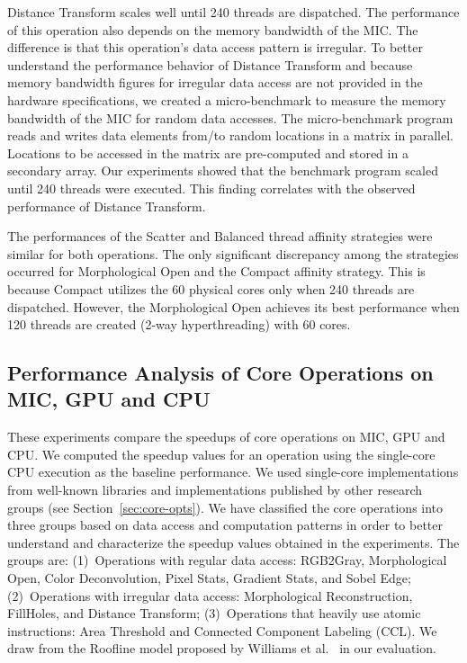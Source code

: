 Distance Transform scales well until 240 threads are dispatched. The performance 
of this operation also depends on the memory bandwidth of the MIC. The 
difference is that this operation's data access pattern is irregular. To 
better understand the performance behavior of Distance Transform and because 
memory bandwidth figures for irregular data access are not provided in the 
hardware specifications, we created a micro-benchmark to measure the memory 
bandwidth of the MIC for random data accesses. The micro-benchmark program reads 
and writes data elements from/to random locations in a matrix in parallel. 
Locations to be accessed in the matrix are pre-computed and stored in a secondary 
array. Our experiments showed that the benchmark program scaled until 240 threads 
were executed. This finding correlates with the observed performance of Distance 
Transform.

The performances of the Scatter and Balanced thread affinity strategies were
similar for both operations. The only significant discrepancy among the
strategies occurred for Morphological Open and the Compact affinity strategy.
This is because Compact utilizes the 60 physical cores only when 240 threads
are dispatched. However, the Morphological Open achieves its best performance
when 120 threads are created (2-way hyperthreading) with 60 cores.

\subsection{Performance Analysis of Core Operations on MIC, GPU and CPU} \label{sec:comp-performance}
These experiments compare the speedups of core operations on MIC, GPU and CPU.
We computed the speedup values for an operation using the single-core CPU
execution as the baseline performance. We used single-core implementations from
well-known libraries and implementations published by other research groups
(see Section~\ref{sec:core-opts}). We have classified the core operations into three groups based on data access 
and computation patterns in order to better understand and characterize the 
speedup values obtained in the experiments. The groups are:
(1)~Operations with regular data access: RGB2Gray, Morphological Open, Color
Deconvolution, Pixel Stats, Gradient Stats, and Sobel Edge; (2)~Operations with
irregular data access: Morphological Reconstruction, FillHoles, and Distance
Transform; (3)~Operations that heavily use atomic instructions: Area
Threshold and Connected Component Labeling (CCL). We draw from the Roofline 
model proposed by Williams et al.~\cite{Williams:2009:RIV:1498765.1498785} 
in our evaluation. 
